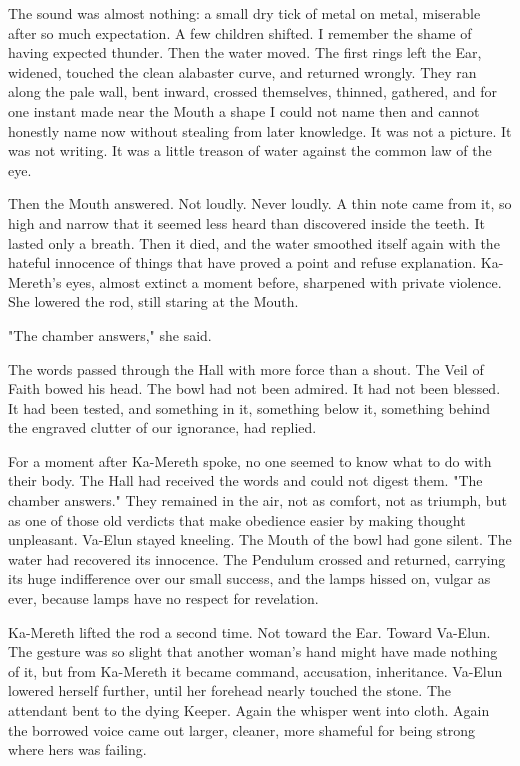 The sound was almost nothing: a small dry tick of metal on metal, miserable after so much expectation. 
A few children shifted. 
I remember the shame of having expected thunder.
Then the water moved.
The first rings left the Ear, widened, touched the clean alabaster curve, and returned wrongly. 
They ran along the pale wall, bent inward, crossed themselves, thinned, gathered, and for one instant made near the Mouth a shape I could 
not name then and cannot honestly name now without stealing from later knowledge. 
It was not a picture. It was not writing. It was a little treason of water against the common law of the eye.\par

Then the Mouth answered. 
Not loudly. 
Never loudly. 
A thin note came from it, so high and narrow that it seemed less heard than discovered inside the teeth. 
It lasted only a breath. 
Then it died, and the water smoothed itself again with the hateful innocence of things that have proved a point and refuse explanation. 
Ka-Mereth’s eyes, almost extinct a moment before, sharpened with private violence. 
She lowered the rod, still staring at the Mouth. \par

"The chamber answers," she said. \par

The words passed through the Hall with more force than a shout. 
The Veil of Faith bowed his head. 
The bowl had not been admired. 
It had not been blessed. 
It had been tested, and something in it, something below it, something behind the engraved clutter of our ignorance, had replied.\par


For a moment after Ka-Mereth spoke, no one seemed to know what to do with their body.
The Hall had received the words and could not digest them. 
"The chamber answers." 
They remained in the air, not as comfort, not as triumph, but as one of those old verdicts that make obedience easier by making thought unpleasant. 
Va-Elun stayed kneeling. 
The Mouth of the bowl had gone silent. 
The water had recovered its innocence. 
The Pendulum crossed and returned, carrying its huge indifference over our small success, and the lamps hissed on, vulgar as ever, because lamps have no respect for revelation.\par

Ka-Mereth lifted the rod a second time.
Not toward the Ear. Toward Va-Elun.
The gesture was so slight that another woman’s hand might have made nothing of it, but from Ka-Mereth it became command, accusation, inheritance. 
Va-Elun lowered herself further, until her forehead nearly touched the stone. 
The attendant bent to the dying Keeper. 
Again the whisper went into cloth. 
Again the borrowed voice came out larger, cleaner, more shameful for being strong where hers was failing.

